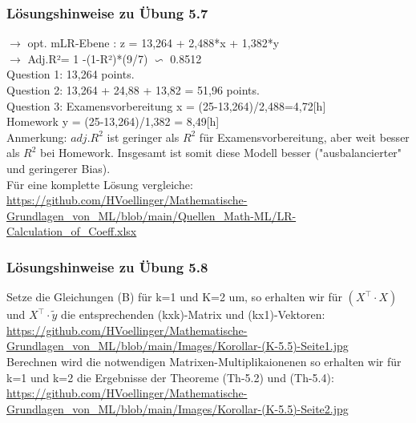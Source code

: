 \documentclass[12pt]{article}
\begin{document}
\subsubsection{Lösungshinweise zu Übung 5.7}
%
$\rightarrow$ opt. mLR-Ebene :  z = 13,264 +  2,488*x +  1,382*y \\[0.2cm]				
$\rightarrow$ Adj.R²=  1 -(1-R²)*(9/7) $\backsim $ 0.8512  \\[0.3cm]				
Question 1:  13,264 points.	\\[0.1cm]
Question 2:  13,264 + 24,88 + 13,82 = 51,96 points.\\[0.1cm]
Question 3:  Examensvorbereitung x = (25-13,264)/2,488=4,72[h]\\ Homework y = (25-13,264)/1,382 = 8,49[h]\\[0.2cm]
Anmerkung: $adj.R^2$ ist geringer als $R^2$ für Examensvorbereitung, aber weit besser als $R^2$ bei Homework. Insgesamt ist somit diese Modell besser ("ausbalancierter" und geringerer Bias). \\[0.2cm]
%	
\hspace*{0.0cm}Für eine komplette Lösung vergleiche:\\
\url{https://github.com/HVoellinger/Mathematische-Grundlagen_von_ML/blob/main/Quellen_Math-ML/LR-Calculation_of_Coeff.xlsx}

\subsubsection{Lösungshinweise zu Übung 5.8}
%
Setze die Gleichungen (B) für k=1 und K=2 um, so erhalten wir für $(X^\top \cdot X)$ und $X^\top \cdot \widetilde{y} $ die entsprechenden (kxk)-Matrix und (kx1)-Vektoren:\\
\url{https://github.com/HVoellinger/Mathematische-Grundlagen_von_ML/blob/main/Images/Korollar-(K-5.5)-Seite1.jpg}  \\
Berechnen wird die notwendigen Matrixen-Multiplikaionenen so erhalten wir für k=1 und k=2 die Ergebnisse der Theoreme (Th-5.2) und (Th-5.4):\\
\url{https://github.com/HVoellinger/Mathematische-Grundlagen_von_ML/blob/main/Images/Korollar-(K-5.5)-Seite2.jpg}
%

\end{document}
